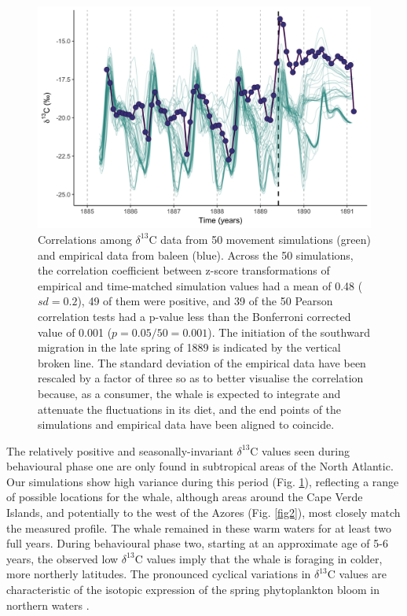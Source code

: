 \documentclass[a4paper,12pt]{article}
\begin{document}
\begin{figure}
  \centering
  \includegraphics[width = \linewidth]{figures/Figure-3-migratory-model-d13C.png}
  \caption{Correlations among $\delta^{13}$C data from 50 movement simulations (green) and empirical data from baleen (blue). Across the 50 simulations, the correlation coefficient between z-score transformations of empirical and time-matched simulation values had a mean of 0.48 ($sd = 0.2$), 49 of them were positive, and 39 of the 50 Pearson correlation tests had a p-value less than the Bonferroni corrected value of 0.001 ($p = 0.05/50 = 0.001$). The initiation of the southward migration in the late spring of 1889 is indicated by the vertical broken line. The standard deviation of the empirical data have been rescaled by a factor of three so as to better visualise the correlation because, as a consumer, the whale is expected to integrate and attenuate the fluctuations in its diet, and the end points of the simulations and empirical data have been aligned to coincide.}
  \label{fig3}
\end{figure}
 
The relatively positive and seasonally-invariant $\delta^{13}$C values seen during behavioural phase one are only found in subtropical areas of the North Atlantic.  
Our simulations show high variance during this period (Fig. \ref{fig3}), reflecting a range of possible locations for the whale, although areas around the Cape Verde Islands, and potentially to the west of the Azores (Fig. \ref{fig2}), most closely match the measured profile. 
The whale remained in these warm waters for at least two full years. 
During behavioural phase two, starting at an approximate age of 5-6 years, the observed low $\delta^{13}$C values imply that the whale is foraging in colder, more northerly latitudes. 
The pronounced cyclical variations in $\delta^{13}$C values are characteristic of the isotopic expression of the spring phytoplankton bloom in northern waters \cite{magozzi2017using}.  
\end{document}
